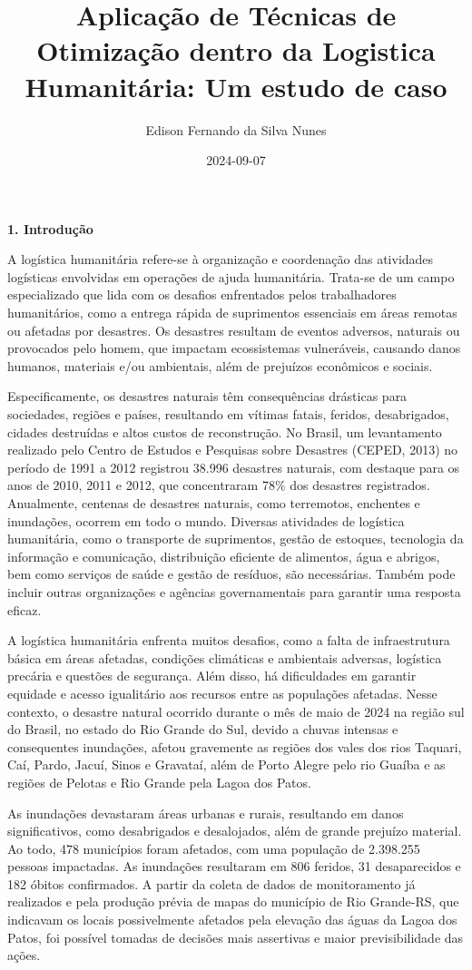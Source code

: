 \documentclass[
]{article}
\title{Aplicação de Técnicas de Otimização dentro da Logistica
Humanitária: Um estudo de caso}
\author{Edison Fernando da Silva Nunes}
\date{2024-09-07}
\begin{document}
\maketitle

\textbf{1. Introdução}

A logística humanitária refere-se à organização e coordenação das
atividades logísticas envolvidas em operações de ajuda humanitária.
Trata-se de um campo especializado que lida com os desafios enfrentados
pelos trabalhadores humanitários, como a entrega rápida de suprimentos
essenciais em áreas remotas ou afetadas por desastres. Os desastres
resultam de eventos adversos, naturais ou provocados pelo homem, que
impactam ecossistemas vulneráveis, causando danos humanos, materiais
e/ou ambientais, além de prejuízos econômicos e sociais.

Especificamente, os desastres naturais têm consequências drásticas para
sociedades, regiões e países, resultando em vítimas fatais, feridos,
desabrigados, cidades destruídas e altos custos de reconstrução. No
Brasil, um levantamento realizado pelo Centro de Estudos e Pesquisas
sobre Desastres (CEPED, 2013) no período de 1991 a 2012 registrou 38.996
desastres naturais, com destaque para os anos de 2010, 2011 e 2012, que
concentraram 78\% dos desastres registrados. Anualmente, centenas de
desastres naturais, como terremotos, enchentes e inundações, ocorrem em
todo o mundo. Diversas atividades de logística humanitária, como o
transporte de suprimentos, gestão de estoques, tecnologia da informação
e comunicação, distribuição eficiente de alimentos, água e abrigos, bem
como serviços de saúde e gestão de resíduos, são necessárias. Também
pode incluir outras organizações e agências governamentais para garantir
uma resposta eficaz.

A logística humanitária enfrenta muitos desafios, como a falta de
infraestrutura básica em áreas afetadas, condições climáticas e
ambientais adversas, logística precária e questões de segurança. Além
disso, há dificuldades em garantir equidade e acesso igualitário aos
recursos entre as populações afetadas. Nesse contexto, o desastre
natural ocorrido durante o mês de maio de 2024 na região sul do Brasil,
no estado do Rio Grande do Sul, devido a chuvas intensas e consequentes
inundações, afetou gravemente as regiões dos vales dos rios Taquari,
Caí, Pardo, Jacuí, Sinos e Gravataí, além de Porto Alegre pelo rio
Guaíba e as regiões de Pelotas e Rio Grande pela Lagoa dos Patos.

As inundações devastaram áreas urbanas e rurais, resultando em danos
significativos, como desabrigados e desalojados, além de grande prejuízo
material. Ao todo, 478 municípios foram afetados, com uma população de
2.398.255 pessoas impactadas. As inundações resultaram em 806 feridos,
31 desaparecidos e 182 óbitos confirmados. A partir da coleta de dados
de monitoramento já realizados e pela produção prévia de mapas do
município de Rio Grande-RS, que indicavam os locais possivelmente
afetados pela elevação das águas da Lagoa dos Patos, foi possível
tomadas de decisões mais assertivas e maior previsibilidade das ações.
\end{document}
